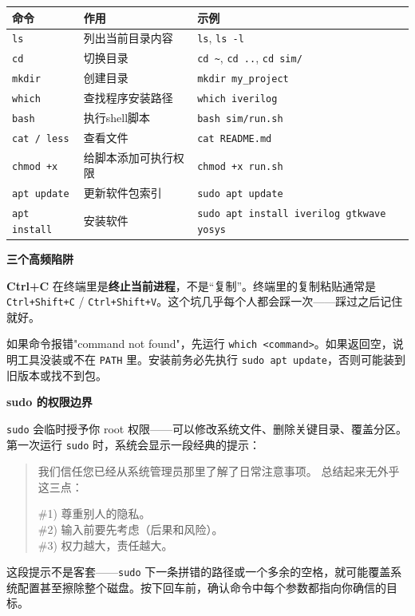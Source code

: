 \documentclass[11pt,a4paper]{article}
\begin{document}
\begin{center}
\begin{tabular}{lll}
\toprule
\textbf{命令} & \textbf{作用} & \textbf{示例} \\
\midrule
\texttt{ls} & 列出当前目录内容 & \texttt{ls}, \texttt{ls -l} \\
\texttt{cd} & 切换目录 & \texttt{cd \textasciitilde}, \texttt{cd ..}, \texttt{cd sim/} \\
\texttt{mkdir} & 创建目录 & \texttt{mkdir my\_project} \\
\texttt{which} & 查找程序安装路径 & \texttt{which iverilog} \\
\texttt{bash} & 执行shell脚本 & \texttt{bash sim/run.sh} \\
\texttt{cat / less} & 查看文件 & \texttt{cat README.md} \\
\texttt{chmod +x} & 给脚本添加可执行权限 & \texttt{chmod +x run.sh} \\
\texttt{apt update} & 更新软件包索引 & \texttt{sudo apt update} \\
\texttt{apt install} & 安装软件 & \texttt{sudo apt install iverilog gtkwave yosys} \\
\bottomrule
\end{tabular}
\end{center}

\textbf{三个高频陷阱}

\begin{warnbox}
\textbf{Ctrl+C} 在终端里是\textbf{终止当前进程}，不是``复制''。终端里的复制粘贴通常是 \texttt{Ctrl+Shift+C} / \texttt{Ctrl+Shift+V}。这个坑几乎每个人都会踩一次——踩过之后记住就好。
\end{warnbox}

\begin{warnbox}
如果命令报错"command not found"，先运行 \texttt{which \textless{}command\textgreater{}}。如果返回空，说明工具没装或不在 \texttt{PATH} 里。安装前务必先执行 \texttt{sudo apt update}，否则可能装到旧版本或找不到包。
\end{warnbox}

\begin{warnbox}
\textbf{sudo 的权限边界}

\texttt{sudo} 会临时授予你 root 权限——可以修改系统文件、删除关键目录、覆盖分区。第一次运行 \texttt{sudo} 时，系统会显示一段经典的提示：

\begin{quote}
我们信任您已经从系统管理员那里了解了日常注意事项。
总结起来无外乎这三点：

\#1) 尊重别人的隐私。\\
\#2) 输入前要先考虑（后果和风险）。\\
\#3) 权力越大，责任越大。
\end{quote}

这段提示不是客套——\texttt{sudo} 下一条拼错的路径或一个多余的空格，就可能覆盖系统配置甚至擦除整个磁盘。按下回车前，确认命令中每个参数都指向你确信的目标。
\end{warnbox}
\end{document}
